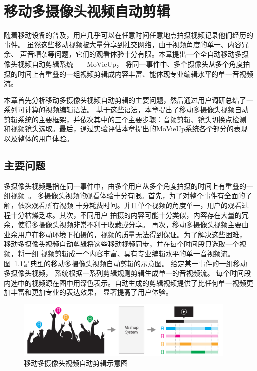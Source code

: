 \documentclass[doctor]{ustcthesis}
\begin{document}
\chapter{移动多摄像头视频自动剪辑}
随着移动设备的普及，用户几乎可以在任意时间任意地点拍摄视频记录他们经历的事件。
虽然这些移动视频被大量分享到社交网络，由于视频角度的单一、内容冗余、
声音嘈杂等问题，它们的观看体验十分有限。本章提出一个全自动移动多摄像头视频自动剪辑系统——MoVieUp，
将同一事件中、多个摄像头从多个角度拍摄的时间上有重叠的一组视频剪辑成内容丰富、能体现专业编辑水平的单一音视频流。

本章首先分析移动多摄像头视频自动剪辑的主要问题，然后通过用户调研总结了一系列可计算的视频编辑语法。
基于这些语法，本章提出了移动多摄像头视频自动剪辑系统的主要框架，并依次其中的三个主要步骤：音频剪辑、镜头切换点检测
和视频镜头选取。最后，通过实验评估本章提出的MoVieUp系统各个部分的表现以及整体的用户体验。

\vspace{-1em}
\section{主要问题}
多摄像头视频是指在同一事件中，由多个用户从多个角度拍摄的时间上有重叠的一组视频~\cite{DBLP:conf/mm/ShresthaWWBA10}。
多摄像头视频的观看体验十分有限。首先，为了对整个事件有全面的了解，依次观看所有视频
十分耗费时间。并且单个视频的角度单一，用户的观看过程十分枯燥乏味。其次，不同用户
拍摄的内容可能十分类似，内容存在大量的冗余，使得多摄像头视频非常不利于收藏或分享。
再次，移动多摄像头视频主要由业余用户在移动环境下拍摄的，视频的质量无法得到保证。为了解决这些困难，
移动多摄像头视频自动剪辑将这些移动视频同步，并在每个时间段只选取一个视频，将一组
视频剪辑成一个内容丰富、具有专业编辑水平的单一音视频流。
图~\ref{fig:mashup-illustrate}是典型的移动多摄像头视频自动剪辑的示意图。
给定某一事件的一组移动多摄像头视频， 系统根据一系列剪辑规则剪辑生成单一的音视频流。
每个时间段内选中的视频源在图中用深色表示。自动生成的剪辑视频提供了比任何单一视频更加丰富和更加专业的表达效果，
显著提高了用户体验。
\begin{figure}[ht]
    \centering
    \includegraphics[clip=true, width=0.95\textwidth]{mashup-illustrate.pdf}
    \caption{移动多摄像头视频自动剪辑示意图}
    \label{fig:mashup-illustrate}
    \vspace{-2em}
\end{figure}
\end{document}
